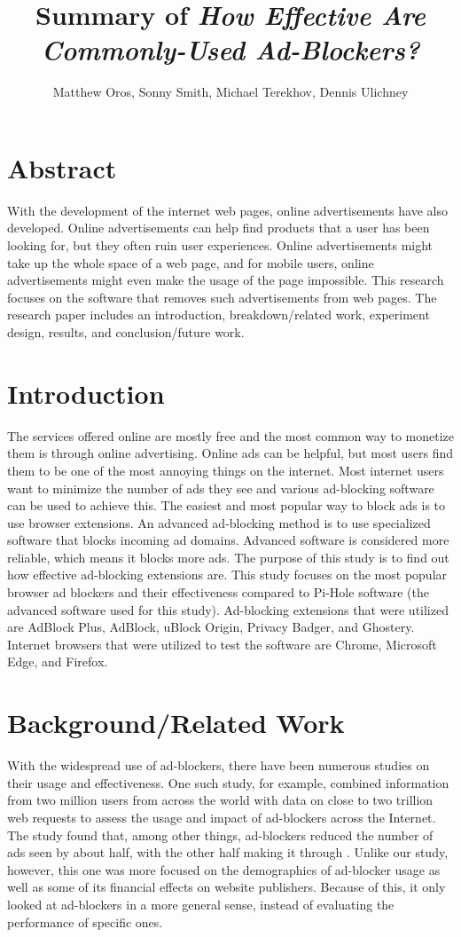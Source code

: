 \documentclass[sigsmall]{acmart}
\title{Summary of \emph{How Effective Are Commonly-Used Ad-Blockers?}}
\author{Matthew Oros, Sonny Smith, Michael Terekhov, Dennis Ulichney}
\begin{document}
\maketitle


\section*{Abstract}
With the development of the internet web pages, online advertisements have also developed. Online advertisements can help find products that a user has been looking for, but they often ruin user experiences. Online advertisements might take up the whole space of a web page, and for mobile users, online advertisements might even make the usage of the page impossible. This research focuses on the software that removes such advertisements from web pages. The research paper includes an introduction, breakdown/related work, experiment design, results, and conclusion/future work.  

\section*{Introduction}
The services offered online are mostly free and the most common way to monetize them is through online advertising. Online ads can be helpful, but most users find them to be one of the most annoying things on the internet. Most internet users want to minimize the number of ads they see and various ad-blocking software can be used to achieve this. The easiest and most popular way to block ads is to use browser extensions. An advanced ad-blocking method is to use specialized software that blocks incoming ad domains. Advanced software is considered more reliable, which means it blocks more ads. The purpose of this study is to find out how effective ad-blocking extensions are. This study focuses on the most popular browser ad blockers and their effectiveness compared to Pi-Hole software (the advanced software used for this study). Ad-blocking extensions that were utilized are AdBlock Plus, AdBlock, uBlock Origin, Privacy Badger, and Ghostery. Internet browsers that were utilized to test the software are Chrome, Microsoft Edge, and Firefox.


\section*{Background/Related Work}
With the widespread use of ad-blockers, there have been numerous studies on their usage and effectiveness. One such study, for example, combined information from two million users from across the world with data on close to two trillion web requests to assess the usage and impact of ad-blockers across the Internet. The study found that, among other things, ad-blockers reduced the number of ads seen by about half, with the other half making it through \cite{10.1145/2987443.2987460}. Unlike our study, however, this one was more focused on the demographics of ad-blocker usage as well as some of its financial effects on website publishers. Because of this, it only looked at ad-blockers in a more general sense, instead of evaluating the performance of specific ones.
\end{document}
